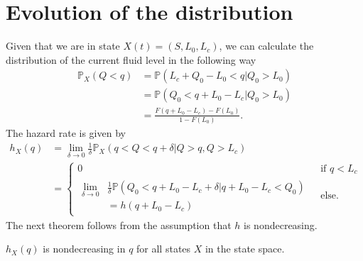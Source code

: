 \section{Evolution of the distribution}
Given that we are in state $X(t)=(S,L_0,L_c)$, we can calculate the distribution of the current fluid level in the following way
\begin{equation}
\begin{split}
\mathbb{P}_{X}(Q<q)&=\mathbb{P}(L_c+Q_0-L_0<q|Q_0>L_0)\\
&=\mathbb{P}(Q_0<q+L_0-L_c|Q_0>L_0)\\
&=\frac{F(q+L_0-L_c)-F(L_0)}{1-F(L_0)}.
\end{split}
\end{equation}
The hazard rate is given by
\begin{equation}
\begin{split}
h_{X}(q)&=\lim\limits_{\delta\rightarrow 0}\frac{1}{\delta}\mathbb{P}_{X}(q<Q<q+\delta|Q>q,Q>L_c)\\
&=\begin{cases}
0&\text{ if }q<L_c\\
\begin{split}
\lim\limits_{\delta\rightarrow 0}&\frac{1}{\delta}\mathbb{P}(Q_0<q+L_0-L_c+\delta|q+L_0-L_c<Q_0)\\
&=h(q+L_0-L_c)
\end{split}&\text{ else.}
\end{cases}
\end{split}
\end{equation}
The next theorem follows from the assumption that $h$ is nondecreasing.
\begin{theorem}
$h_{X}(q)$ is nondecreasing in $q$ for all states $X$ in the state space.
\end{theorem}

